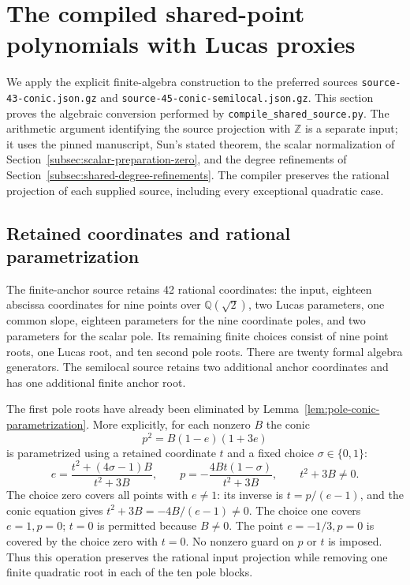 \documentclass[11pt]{article}
\theoremstyle{definition}
\begin{document}
\section{The compiled shared-point polynomials with Lucas proxies}
\label{sec:compiled-shared-polynomials}

We apply the explicit finite-algebra construction to the preferred
sources \texttt{source-43-conic.json.gz} and
\texttt{source-45-conic-semilocal.json.gz}.  This section proves the
algebraic conversion performed by \texttt{compile\_shared\_source.py}.
The arithmetic argument identifying the source projection with
$\mathbb Z$ is a separate input; it uses the pinned manuscript,
Sun's stated theorem, the scalar normalization of
Section~\ref{subsec:scalar-preparation-zero}, and the degree
refinements of Section~\ref{subsec:shared-degree-refinements}.
The compiler preserves the rational projection of each supplied
source, including every exceptional quadratic case.

\subsection{Retained coordinates and rational parametrization}

The finite-anchor source retains 42 rational coordinates: the
input, eighteen abscissa coordinates for nine points over
$\mathbb Q(\sqrt2)$, two Lucas parameters, one common slope,
eighteen parameters for the nine coordinate poles, and two
parameters for the scalar pole.  Its remaining finite choices
consist of nine point roots, one Lucas root, and ten second
pole roots.  There are twenty formal algebra generators.
The semilocal source retains two additional anchor coordinates
and has one additional finite anchor root.

The first pole roots have already been eliminated by
Lemma~\ref{lem:pole-conic-parametrization}.  More explicitly,
for each nonzero $B$ the conic
\[
                     p^2=B(1-e)(1+3e)
\]
is parametrized using a retained coordinate $t$ and a fixed
choice $\sigma\in\{0,1\}$:
\[
 e=\frac{t^2+(4\sigma-1)B}{t^2+3B},\qquad
 p=-\frac{4Bt(1-\sigma)}{t^2+3B},\qquad t^2+3B\ne0.
\]
The choice zero covers all points with $e\ne1$: its inverse is
$t=p/(e-1)$, and the conic equation gives
$t^2+3B=-4B/(e-1)\ne0$.  The choice one covers $e=1,p=0$;
$t=0$ is permitted because $B\ne0$.  The point $e=-1/3,p=0$
is covered by the choice zero with $t=0$.  No nonzero guard on
$p$ or $t$ is imposed.  Thus this operation preserves the rational
input projection while removing one finite quadratic root in
each of the ten pole blocks.
\end{document}
